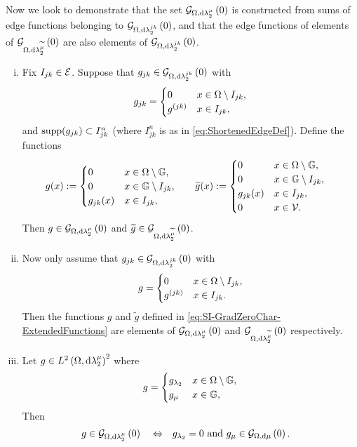 Now we look to demonstrate that the set $\mathcal{G}_{ \Omega, \mathrm{d}\lambda_2^{\mu}}\left( 0 \right)$ is constructed from sums of edge functions belonging to $\mathcal{G}_{ \Omega, \mathrm{d}\lambda_2^{jk}}\left( 0 \right)$, and that the edge functions of elements of $\mathcal{G}_{ \Omega, \mathrm{d}\lambda_2^{\widetilde{\mu}}}\left( 0 \right)$ are also elements of $\mathcal{G}_{ \Omega, \mathrm{d}\lambda_2^{jk}}\left( 0 \right)$.
\begin{prop} \label{prop:SI-GradZeroExtensionAndChar}
	
	\begin{enumerate}[(i)]
		\item Fix $I_{jk}\in\mathcal{E}$.
		Suppose that $g_{jk}\in\mathcal{G}_{ \Omega, \mathrm{d}\lambda_2^{jk}}\left( 0 \right)$ with
		\begin{align*}
			g_{jk} = \begin{cases} 0 & x\in\Omega\setminus I_{jk}, \\ g^{(jk)} & x\in I_{jk}, \end{cases}
		\end{align*}
		and $\mathrm{supp}(g_{jk})\subset I_{jk}^n$ (where $I_{jk}^n$ is as in \eqref{eq:ShortenedEdgeDef}).
		Define the functions
		\begin{align} \label{eq:SI-GradZeroChar-ExtendedFunctions}
			g(x) := \begin{cases} 0 & x\in\Omega\setminus\mathbb{G}, \\ 0 & x\in\mathbb{G}\setminus I_{jk}, \\ g_{jk}(x) & x\in I_{jk}, \end{cases}
			&\qquad
			\widetilde{g}(x) := \begin{cases} 0 & x\in\Omega\setminus\mathbb{G}, \\ 0 & x\in\mathbb{G}\setminus I_{jk}, \\ g_{jk}(x) & x\in I_{jk}, \\ 0 & x\in\mathcal{V}. \end{cases}			
		\end{align}
		Then $g\in\mathcal{G}_{ \Omega, \mathrm{d}\lambda_2^{\mu}}\left( 0 \right)$ and $\widetilde{g}\in\mathcal{G}_{ \Omega, \mathrm{d}\lambda_2^{\widetilde{\mu}}}\left( 0 \right)$.
		\item Now only assume that $g_{jk}\in\mathcal{G}_{ \Omega, \mathrm{d}\lambda_2^{jk}}\left( 0 \right)$ with
		\begin{align*}
			g = \begin{cases} 0 & x\in\Omega\setminus I_{jk}, \\ g^{(jk)} & x\in I_{jk}. \end{cases}
		\end{align*}
		Then the functions $g$ and $\widetilde{g}$ defined in \eqref{eq:SI-GradZeroChar-ExtendedFunctions} are elements of $\mathcal{G}_{ \Omega, \mathrm{d}\lambda_2^{\mu}}\left( 0 \right)$ and $\mathcal{G}_{ \Omega, \mathrm{d}\lambda_2^{\widetilde{\mu}}}\left( 0 \right)$ respectively.
		\item Let $g\in L^{2}\left( \Omega,\mathrm{d} \lambda_2^{\mu} \right)^2$ where
	\begin{align*}
		g = \begin{cases} g_{\lambda_2} & x\in\Omega\setminus\mathbb{G}, \\ g_{\mu} & x\in\mathbb{G}, \end{cases}
	\end{align*}
	Then 
	\begin{align*}
		g\in\mathcal{G}_{ \Omega, \mathrm{d}\lambda_2^{\mu}}\left( 0 \right)
		\quad\Leftrightarrow\quad &
		g_{\lambda_2} = 0 \text{ and } g_{\mu}\in\mathcal{G}_{ \Omega, \mathrm{d}\mu}\left( 0 \right).
	\end{align*}
	\end{enumerate}
\end{prop}
